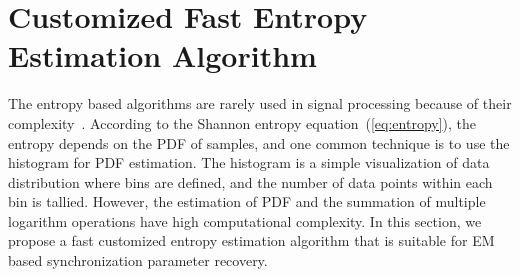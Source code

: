 \documentclass[journal,comsoc]{IEEEtran}
\begin{document}
\section{Customized Fast Entropy Estimation Algorithm}
\label{sec:cust_entp}
The entropy based algorithms are rarely used in signal processing because of their complexity~\cite{Bercher2000}.
According to the Shannon entropy equation~(\ref{eq:entropy}), the entropy depends on the PDF of samples, and one common technique is to use the histogram for PDF estimation.
The histogram is a simple visualization of data distribution where bins are defined, and the number of data points within each bin is tallied. 
However, the estimation of PDF and the summation of multiple logarithm operations have high computational complexity.
In this section, we propose a fast customized entropy estimation algorithm that is suitable for EM based synchronization parameter recovery. 
\end{document}
